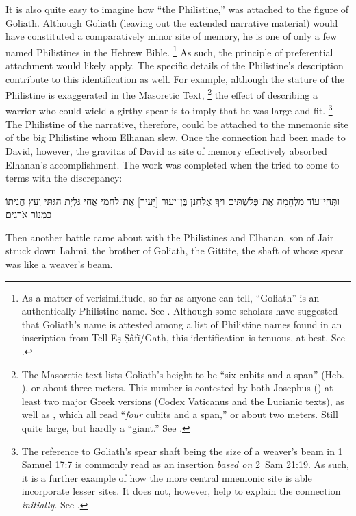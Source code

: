 It is also quite easy to imagine how ``the Philistine,'' was attached to the figure of Goliath. Although Goliath (leaving out the extended narrative material) would have constituted a comparatively minor site of memory, he is one of only a few named Philistines in the Hebrew Bible.%
    \footnote{As a matter of verisimilitude, so far as anyone can tell, ``Goliath'' is an authentically Philistine name. See \autocite[291]{mccarter1980}. Although some scholars have suggested that Goliath's name is attested among a list of Philistine names found in an inscription from Tell Eṣ-Ṣâfī/Gath, this identification is tenuous, at best. See \cite{maeir-etal_basor2008}.}
As such, the principle of preferential attachment would likely apply. The specific details of the Philistine's description contribute to this identification as well. For example, although the stature of the Philistine is exaggerated in the Masoretic Text,%
    \footnote{The Masoretic text lists Goliath's height to be ``six cubits and a span'' (Heb. ), or about three meters. This number is contested by both Josephus () at least two major Greek versions (Codex Vaticanus and the Lucianic texts), as well as , which all read ``\emph{four} cubits and a span,'' or about two meters. Still quite large, but hardly a ``giant.'' See \cite[286]{mccarter1980}.}
the effect of describing a warrior who could wield a girthy spear is to imply that he was large and fit.%
    \footnote{The reference to Goliath's spear shaft being the size of a weaver's beam in 1 Samuel 17:7 is commonly read as an insertion \emph{based on} 2~Sam 21:19.  As such, it is a further example of how the more central mnemonic site is able incorporate lesser sites. It does not, however, help to explain the connection \emph{initially}. See \cite[292]{mccarter1980}.}
The Philistine of the narrative, therefore, could be attached to the mnemonic site of the big Philistine whom Elhanan slew. Once the connection had been made to David, however, the gravitas of David as site of memory effectively absorbed Elhanan's accomplishment. The work was completed when the \chronicler tried to come to terms with the discrepancy:
\begin{hebrewtext}
    וַתְּהִי־עוֹד מִלְחָמָה אֶת־פְּלִשְׁתִּים וַיַּךְ אֶלְחָנָן בֶּן־יָעוּר [יָעִיר] אֶת־לַחְמִי אֲחִי גָּלְיָת הַגִּתִּי וְעֵץ חֲנִיתוֹ כִּמְנוֹר אֹרְגִים׃ 
\end{hebrewtext}
\begin{translation}
    Then another battle came about with the Philistines and Elhanan, son of Jair struck down Lahmi, the brother of Goliath, the Gittite, the shaft of whose spear was like a weaver's beam.
\end{translation}
